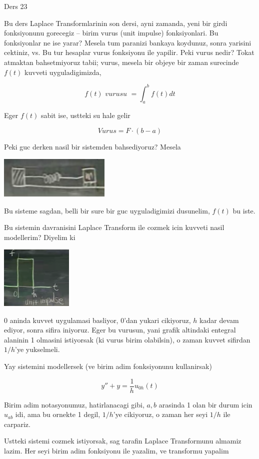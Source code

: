 \documentclass[12pt,fleqn]{article}\usepackage{../common}
\begin{document}
Ders 23 

Bu ders Laplace Transformlarinin son dersi, ayni zamanda, yeni bir girdi
fonksiyonunu gorecegiz -- birim vurus (unit impulse) fonksiyonlari. Bu
fonksiyonlar ne ise yarar? Mesela tum paranizi bankaya koydunuz, sonra
yarisini cektiniz, vs. Bu tur hesaplar vurus fonksiyonu ile yapilir. Peki
vurus nedir? Tokat atmaktan bahsetmiyoruz tabii; vurus, mesela bir objeye
bir zaman surecinde $f(t)$ kuvveti uyguladigimizda,

\[ f(t) \textit{ vurusu } = \int _{a}^{b}f(t)dt \]

Eger $f(t)$ sabit ise, ustteki su hale gelir

\[ Vurus = F \cdot (b-a) \]

Peki guc derken nasil bir sistemden bahsediyoruz? Mesela

\includegraphics[height=2cm]{23_1.png}

Bu sisteme sagdan, belli bir sure bir guc uyguladigimizi dusunelim, $f(t)$
bu iste. 

Bu sistemin davranisini Laplace Transform ile cozmek icin kuvveti nasil
modellerim? Diyelim ki 

\includegraphics[height=3cm]{23_2.png}

0 aninda kuvvet uygulamasi basliyor, 0'dan yukari cikiyoruz, $h$ kadar
devam ediyor, sonra sifira iniyoruz. Eger bu vurusun, yani grafik altindaki
entegral alaninin 1 olmasini istiyorsak (ki vurus birim olabilsin), o zaman
kuvvet sifirdan $1/h$'ye yukselmeli. 

Yay sistemini modellersek (ve birim adim fonksiyonunu kullanirsak)

\[ y'' + y  = \frac{1}{h}u_{0h}(t) \]

Birim adim notasyonumuz, hatirlanacagi gibi, $a,b$ arasinda 1 olan bir
durum icin $u_{ab}$ idi, ama bu ornekte 1 degil, $1/h$'ye cikiyoruz, o
zaman her seyi $1/h$ ile carpariz.

Ustteki sistemi cozmek istiyorsak, sag tarafin Laplace Transformunu almamiz
lazim. Her seyi birim adim fonksiyonu ile yazalim, ve transformu yapalim
\end{document}

